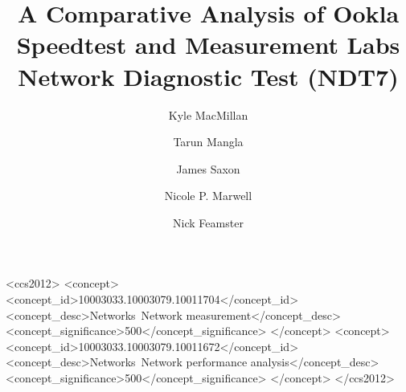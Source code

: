 \documentclass[sigconf]{acmart}
\begin{document}



\title{A Comparative Analysis of Ookla Speedtest and Measurement Labs Network
Diagnostic Test (NDT7)}


\author{Kyle MacMillan}

\author{Tarun Mangla}

\author{James Saxon}

\author{Nicole P. Marwell}

\author{Nick Feamster}

\renewcommand{\shortauthors}{Kyle MacMillan et al.}



\begin{CCSXML}
<ccs2012>
   <concept>
	   <concept_id>10003033.10003079.10011704</concept_id>
	   <concept_desc>Networks~Network measurement</concept_desc>
	   <concept_significance>500</concept_significance>
	   </concept>
   <concept>
	   <concept_id>10003033.10003079.10011672</concept_id>
	   <concept_desc>Networks~Network performance analysis</concept_desc>
	   <concept_significance>500</concept_significance>
	   </concept>
 </ccs2012>
\end{CCSXML}
\end{document}
